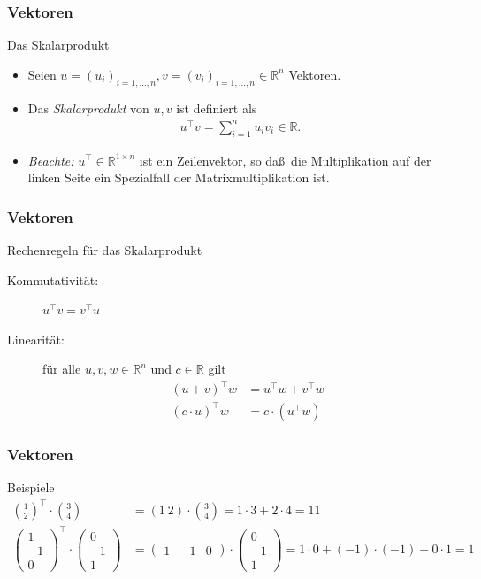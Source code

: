 \documentclass{beamer}
\renewcommand{\emph}[1]{{\textcolor{solarizedRed}{\itshape #1}}}
\newcommand\RR{\mathbb R}
\newcommand{\trans}{\top}
\renewcommand{\ae}{\"a}
\newcommand{\ue}{\"u}
\newcommand{\mytitle}{Vektoren}
\begin{document}
\begin{frame}\frametitle{\mytitle}
	\begin{block}{Das Skalarprodukt}
		\begin{itemize}
			\item Seien $u=(u_i)_{i=1,\ldots,n},v=(v_i)_{i=1,\ldots,n}\in\RR^n$ Vektoren.
			\item Das \emph{Skalarprodukt} von $u,v$ ist definiert als
				\begin{align*}
					u^\trans v=\sum_{i=1}^nu_iv_i\in\RR.
				\end{align*}
			\item \emph{Beachte:} $u^\trans\in\RR^{1\times n}$ ist ein Zeilenvektor, so da\ss\ die Multiplikation auf der linken Seite ein Spezialfall der Matrixmultiplikation ist.
		\end{itemize}
	\end{block}
\end{frame}

\begin{frame}\frametitle{\mytitle}
	\begin{block}{Rechenregeln f\ue r das Skalarprodukt}
		\begin{description}
			\item[Kommutativit\ae t:] $u^\trans v=v^\trans u$
			\item[Linearit\ae t:] f\ue r alle $u,v,w\in\RR^n$ und $c\in\RR$ gilt
				\begin{align*}
					(u+v)^\trans w&=u^\trans w+v^\trans w\\
					(c\cdot u)^\trans w&=c\cdot(u^\trans w)
				\end{align*}
		\end{description}
	\end{block}
\end{frame}

\begin{frame}\frametitle{\mytitle}
	\begin{block}{Beispiele}
		\begin{align*}
			\binom12^\trans\cdot\binom34&=(1\ 2)\cdot\binom 34=1\cdot 3+2\cdot 4=11\\
			\begin{pmatrix}1\\-1\\0\end{pmatrix}^\trans\cdot\begin{pmatrix}0\\-1\\1\end{pmatrix}&=
			\begin{pmatrix}1&-1&0\end{pmatrix}\cdot\begin{pmatrix}0\\-1\\1\end{pmatrix}=1\cdot 0+(-1)\cdot(-1)+0\cdot 1=1
		\end{align*}
	\end{block}
\end{frame}
\end{document}
